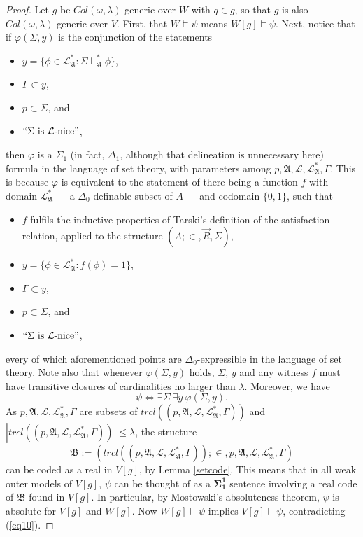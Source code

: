 \documentclass[12pt]{article}
\numberwithin{equation}{section}
\begin{document}
\begin{proof}
Let $g$ be $Col(\omega, \lambda)$-generic over $W$ with $q \in g$, so that $g$ is also $Col(\omega, \lambda)$-generic over $V$. First, that $W \models \psi$ means $W[g] \models \psi$. Next, notice that if $\varphi(\Sigma, y)$ is the conjunction of the statements
\begin{itemize}
    \item $y = \{\phi \in \mathcal{L}^*_{\mathfrak{A}} : \Sigma \models^*_{\mathfrak{A}} \phi\}$,
    \item $\Gamma \subset y$, 
    \item $p \subset \Sigma$, and
    \item $``\Sigma \text{ is } \mathcal{L}\text{-nice}"$, 
\end{itemize}
then $\varphi$ is a $\Sigma_1$ (in fact, $\Delta_1$, although that delineation is unnecessary here) formula in the language of set theory, with parameters among $p, \mathfrak{A}, \mathcal{L}, \mathcal{L}^*_{\mathfrak{A}}, \Gamma$. This is because $\varphi$ is equivalent to the statement of there being a function $f$ with domain $\mathcal{L}^*_{\mathfrak{A}}$ --- a $\Delta_0$-definable subset of $A$ --- and codomain $\{0, 1\}$, such that 
\begin{itemize}
    \item $f$ fulfils the inductive properties of Tarski's definition of the satisfaction relation, applied to the structure $(A; \in, \Vec{R}, \Sigma)$,
    \item $y = \{\phi \in \mathcal{L}^*_{\mathfrak{A}} : f(\phi) = 1\}$, 
    \item $\Gamma \subset y$,
    \item $p \subset \Sigma$, and
    \item $``\Sigma \text{ is } \mathcal{L}\text{-nice}"$,
\end{itemize}
every of which aforementioned points are $\Delta_0$-expressible in the language of set theory. Note also that whenever $\varphi(\Sigma, y)$ holds, $\Sigma$, $y$ and any witness $f$ must have transitive closures of cardinalities no larger than $\lambda$. Moreover, we have $$\psi \iff \exists \Sigma \ \exists y \ \varphi(\Sigma, y).$$ As $p, \mathfrak{A}, \mathcal{L}, \mathcal{L}^*_{\mathfrak{A}}, \Gamma$ are subsets of $trcl((p, \mathfrak{A}, \mathcal{L}, \mathcal{L}^*_{\mathfrak{A}}, \Gamma))$ and $|trcl((p, \mathfrak{A}, \mathcal{L}, \mathcal{L}^*_{\mathfrak{A}}, \Gamma))| \leq \lambda$, the structure $$\mathfrak{B} := (trcl((p, \mathfrak{A}, \mathcal{L}, \mathcal{L}^*_{\mathfrak{A}}, \Gamma)); \in, p, \mathfrak{A}, \mathcal{L}, \mathcal{L}^*_{\mathfrak{A}}, \Gamma)$$ can be coded as a real in $V[g]$, by Lemma \ref{setcode}. This means that in all weak outer models of $V[g]$, $\psi$ can be thought of as a $\mathbf{\Sigma^1_1}$ sentence involving a real code of $\mathfrak{B}$ found in $V[g]$. In particular, by Mostowski's absoluteness theorem, $\psi$ is absolute for $V[g]$ and $W[g]$. Now $W[g] \models \psi$ implies $V[g] \models \psi$, contradicting (\ref{eq10}).
\end{proof}
\end{document}
